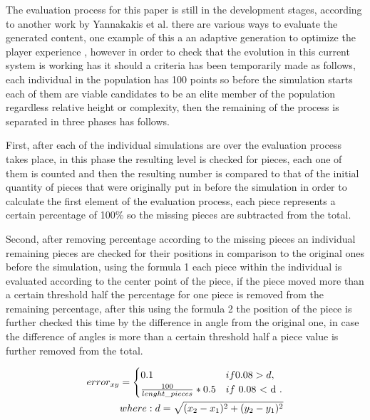 \documentclass[graybox]{svmult}
\begin{document}
The evaluation process for this paper is still in the development stages, according to another work by Yannakakis et al. \cite{YannakakisContentGeneration} there are various ways to evaluate the generated content, one example of this a an adaptive generation to optimize the player experience \cite{Shaker2010}, however in order to check that the evolution in this current system is working has it should a criteria has been temporarily made as follows, each individual in the population has 100 points so before the simulation starts each of them are viable candidates to be an elite member of the population regardless relative height or complexity, then the remaining of the process is separated in three phases has follows.

First, after each of the individual simulations are over the evaluation process takes place, in this phase the resulting level is checked for pieces, each one of them is counted and then the resulting number is compared to that of the initial quantity of pieces that were originally put in before the simulation in order to calculate the first element of the evaluation process, each piece represents a certain percentage of 100\% so the missing pieces are subtracted from the total.

Second, after removing percentage according to the missing pieces an individual remaining pieces are checked for their positions in comparison to the original ones before the simulation, using the formula 1 each piece within the individual is evaluated according to the center point of the piece, if the piece moved more than a certain threshold half the percentage for one piece is removed from the remaining percentage, after this using the formula 2 the position of the piece is further checked this time by the difference in angle from the original one, in case the difference of angles is more than a certain threshold half a piece value is further removed from the total.

\begin{equation}
    \begin{aligned}
        error_{xy} =
            \begin{cases}
                0.1 & if 0.08 > d, \\
                \frac{100}{lenght\_pieces} * 0.5 & if $ 0.08 < d $.
            \end{cases} \\
        where: d=\sqrt{(x_2 - x_1)^2 + (y_2 - y_1)^2}    
    \end{aligned}
\end{equation}
\end{document}
